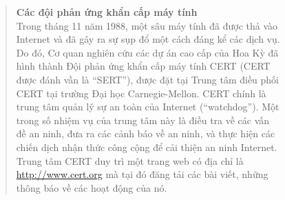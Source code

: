 \begin{figure}
  \begin{quotation}
    \noindent
    \textbf{Các đội phản ứng khẩn cấp máy tính}\vspace{0.3cm}
    \\
    Trong tháng 11 năm 1988, một sâu máy tính đã được thả vào Internet và đã gây ra sự sụp
    đổ một cách đáng kể các dịch vụ. Do đó, Cơ quan nghiên cứu các dự án cao cấp của Hoa
    Kỳ đã hình thành Đội phản ứng khẩn cấp máy tính CERT (CERT được đánh vần là ``SERT''),
    được đặt tại Trung tâm điều phối CERT tại trường Đại học Carnegie-Mellon. CERT chính
    là trung tâm quản lý sự an toàn của Internet (``watchdog''). Một trong số nhiệm vụ của
    trung tâm này là điều tra về các vấn đề an ninh, đưa ra các cảnh báo về an ninh, và
    thực hiện các chiến dịch nhận thức công cộng để cải thiện an ninh Internet. Trung tâm
    CERT duy trì một trang web có địa chỉ là \url{http://www.cert.org} mà tại đó đăng tải
    các bài viết, những thông báo về các hoạt động của nó.
  \end{quotation}
\end{figure}

